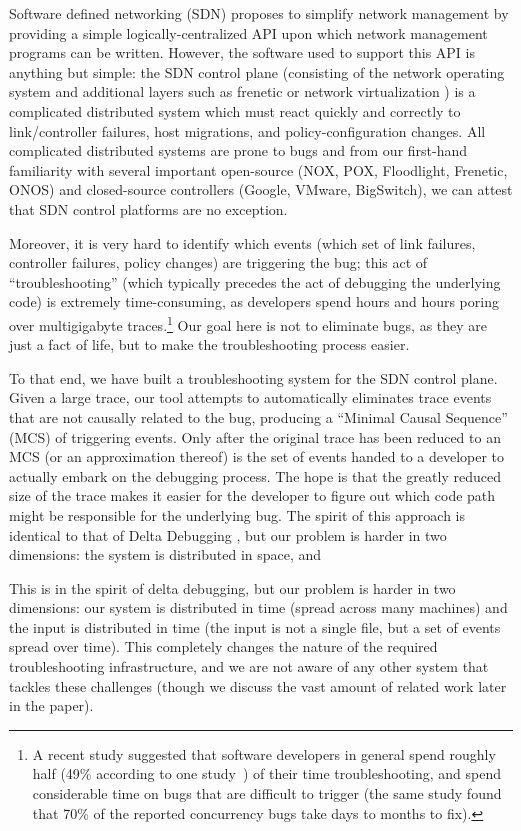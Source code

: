 Software defined networking (SDN) proposes to simplify network management by providing a simple logically-centralized API upon which network management programs can be written. However, the software used to support this API is anything but simple: the SDN control plane (consisting of the network operating system and additional layers such as frenetic \cite{frenetic} or network virtualization \cite{mido,nicira}) is a complicated distributed system which must react quickly and correctly to link/controller failures, host migrations, and policy-configuration changes. All complicated distributed systems are prone to bugs and from our first-hand familiarity with several important open-source (NOX, POX, Floodlight, Frenetic, ONOS) and closed-source controllers (Google, VMware, BigSwitch), we can attest that SDN control platforms are no exception. 

Moreover, it is very hard to identify which events (\ie which set of link failures, controller failures, policy changes) are triggering the bug; this act of ``troubleshooting'' (which typically precedes the act of debugging the underlying code) is extremely time-consuming, as developers spend hours and hours poring over multigigabyte traces.\footnote{A recent study suggested that software developers in general spend roughly half (49\% according to one
study~\cite{msoft_concurrency}) of their time troubleshooting, and spend
considerable time on bugs that are difficult to trigger
(the same study found that 70\% of the reported concurrency bugs
take days to months to fix).} Our goal here is not to eliminate bugs, as they are just a fact of life, but to make the troubleshooting process easier.

To that end, we have built a troubleshooting system for the SDN control plane. Given a large trace, our tool attempts to automatically eliminates trace events that are not causally related to the bug, producing a “Minimal Causal Sequence” (MCS) of triggering events. Only after the original trace has been reduced to an MCS (or an approximation thereof) is the set of events handed to a developer to actually embark on the debugging process. The hope is that the greatly reduced size of the trace makes it easier for the developer to figure out which code path might be responsible for the underlying bug.  The spirit of this approach is identical to that of Delta Debugging \cite{dd}, but our problem is harder in two dimensions: the system is distributed in space, and 

This is in the spirit of delta debugging, but our problem is harder in two dimensions: our system is distributed in time (\ie spread across many machines) and the input is distributed in time (\ie the input is not a single file, but a set of events spread over time). This completely changes the nature of the required troubleshooting infrastructure, and we are not aware of any other system that tackles these challenges (though we discuss the vast amount of related work later in the paper).

